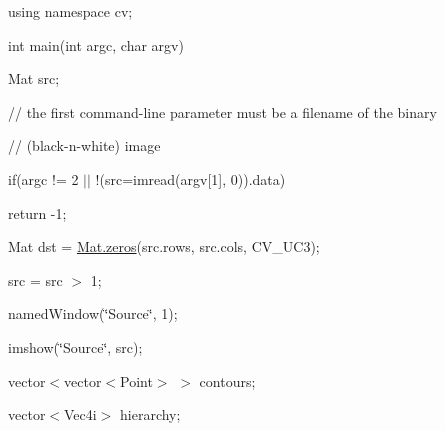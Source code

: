 {\ttfamily using namespace cv;}

{\ttfamily }

{\ttfamily }

{\ttfamily int main(int argc, char argv)}

{\ttfamily }

{\ttfamily }

{\ttfamily Mat src;}

{\ttfamily }

{\ttfamily }

{\ttfamily // the first command-\/line parameter must be a filename of the binary}

{\ttfamily }

{\ttfamily }

{\ttfamily // (black-\/n-\/white) image}

{\ttfamily }

{\ttfamily }

{\ttfamily if(argc != 2 $\vert$$\vert$ !(src=imread(argv\mbox{[}1\mbox{]}, 0)).data)}

{\ttfamily }

{\ttfamily }

{\ttfamily return -\/1;}

{\ttfamily }

{\ttfamily }

{\ttfamily Mat dst = \mbox{\hyperlink{classorg_1_1opencv_1_1core_1_1_mat_aff41070138369b96f792b19f01ab00d9}{Mat.\+zeros}}(src.\+rows, src.\+cols, C\+V\+\_\+U\+C3);}

{\ttfamily }

{\ttfamily }

{\ttfamily src = src $>$ 1;}

{\ttfamily }

{\ttfamily }

{\ttfamily named\+Window(\char`\"{}\+Source\char`\"{}, 1);}

{\ttfamily }

{\ttfamily }

{\ttfamily imshow(\char`\"{}\+Source\char`\"{}, src);}

{\ttfamily }

{\ttfamily }

{\ttfamily vector$<$vector$<$\+Point$>$ $>$ contours;}

{\ttfamily }

{\ttfamily }

{\ttfamily vector$<$\+Vec4i$>$ hierarchy;}

{\ttfamily }

